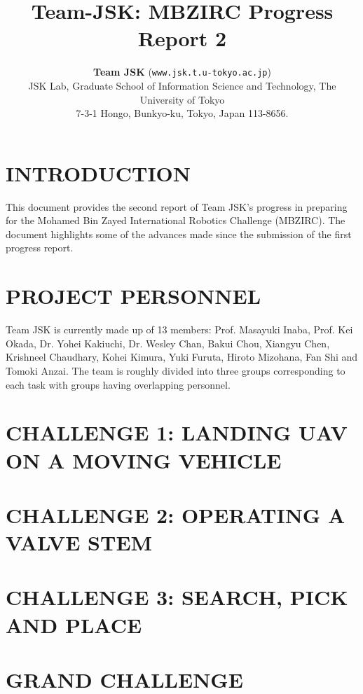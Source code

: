 \documentclass[letterpaper, 10 pt, conference]{ieeeconf}  %
\title{\LARGE \bf
  Team-JSK: MBZIRC Progress Report 2
}
\author{\textbf{Team JSK} ({\texttt{www.jsk.t.u-tokyo.ac.jp}})%
  \\ JSK Lab, Graduate School of Information Science and Technology,
  The University of Tokyo \\
  7-3-1 Hongo, Bunkyo-ku, Tokyo, Japan 113-8656.  \\
}
\begin{document}
\maketitle
\thispagestyle{empty}
\pagestyle{empty}


\section{INTRODUCTION}
This document provides the second report of 
Team JSK's progress in preparing
for the Mohamed Bin Zayed International Robotics Challenge
(MBZIRC). The document highlights some of the advances made since the submission of the first progress report.


\section{PROJECT PERSONNEL}
Team JSK is currently made up of 13 members: Prof. Masayuki Inaba, Prof. Kei
Okada, Dr. Yohei Kakiuchi, Dr. Wesley Chan, Bakui Chou, Xiangyu Chen,
Krishneel Chaudhary, Kohei Kimura, Yuki Furuta, Hiroto
Mizohana, Fan Shi and Tomoki Anzai. The team is roughly divided into
three groups corresponding to each task with groups having overlapping
personnel.

\section{CHALLENGE 1: LANDING UAV ON A MOVING VEHICLE}




\section{CHALLENGE 2: OPERATING A VALVE STEM}


\section{CHALLENGE 3: SEARCH, PICK AND PLACE}


\section{GRAND CHALLENGE}


\end{document}
